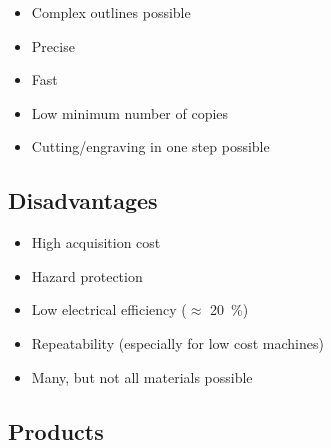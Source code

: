 \documentclass[aspectratio=169]{beamer}
\begin{document}
\begin{frame}
    \begin{itemize}
        \item Complex outlines possible
        \item Precise
        \item Fast
        \item Low minimum number of copies
        \item Cutting/engraving in one step possible
    \end{itemize}
\end{frame}

\subsection{Disadvantages}

\begin{frame}
    \begin{itemize}
        \item High acquisition cost
        \item Hazard protection
        \item Low electrical efficiency ($\approx$ \SI{20}{\percent})
        \item Repeatability (especially for low cost machines)
        \item Many, but not all materials possible
    \end{itemize}
\end{frame}

\subsection{Products}
\end{document}
